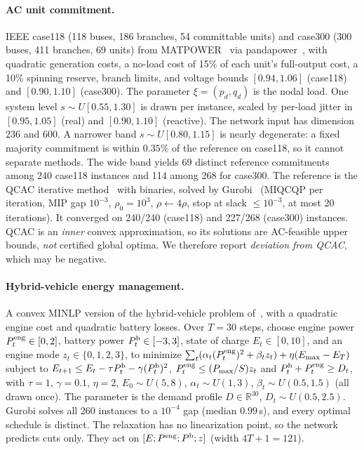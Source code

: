 \documentclass[10pt]{article}
\newcommand{\R}{\mathbb{R}}
\begin{document}
\paragraph{AC unit commitment.} IEEE case118 (118 buses, 186 branches, 54 committable units) and case300 (300 buses, 411 branches, 69 units) from MATPOWER~\citep{zimmerman2011matpower} via pandapower~\citep{thurner2018pandapower}, with quadratic generation costs, a no-load cost of 15\% of each unit's full-output cost, a 10\% spinning reserve, branch limits, and voltage bounds $[0.94,1.06]$ (case118) and $[0.90,1.10]$ (case300). The parameter $\xi=(p_d,q_d)$ is the nodal load. One system level $s\sim U[0.55,1.30]$ is drawn per instance, scaled by per-load jitter in $[0.95,1.05]$ (real) and $[0.90,1.10]$ (reactive). The network input has dimension $236$ and $600$. A narrower band $s\sim U[0.80,1.15]$ is nearly degenerate: a fixed majority commitment is within $0.35\%$ of the reference on case118, so it cannot separate methods. The wide band yields 69 distinct reference commitments among 240 case118 instances and 114 among 268 for case300. The reference is the QCAC iterative method~\citep{constante2025qcac} with binaries, solved by Gurobi~\citep{gurobi} (MIQCQP per iteration, MIP gap $10^{-3}$, $\rho_0=10^3$, $\rho\leftarrow4\rho$, stop at slack $\le10^{-3}$, at most 20 iterations). It converged on 240/240 (case118) and 227/268 (case300) instances. QCAC is an \emph{inner} convex approximation, so its solutions are AC-feasible upper bounds, \emph{not} certified global optima. We therefore report \emph{deviation from QCAC}, which may be negative.

\paragraph{Hybrid-vehicle energy management.} A convex MINLP version of the hybrid-vehicle problem of~\citep{dixit2025dfsm}, with a quadratic engine cost and quadratic battery losses. Over $T=30$ steps, choose engine power $P^{\rm eng}_t\in[0,2]$, battery power $P^{\rm b}_t\in[-3,3]$, state of charge $E_t\in[0,10]$, and an engine mode $z_t\in\{0,1,2,3\}$, to minimize $\sum_t(\alpha_t(P^{\rm eng}_t)^2+\beta_tz_t)+\eta(E_{\max}-E_T)$ subject to $E_{t+1}\le E_t-\tau P^{\rm b}_t-\gamma(P^{\rm b}_t)^2$, $P^{\rm eng}_t\le(P_{\max}/S)z_t$ and $P^{\rm b}_t+P^{\rm eng}_t\ge D_t$, with $\tau=1$, $\gamma=0.1$, $\eta=2$, $E_0\sim U(5,8)$, $\alpha_t\sim U(1,3)$, $\beta_t\sim U(0.5,1.5)$ (all drawn once). The parameter is the demand profile $D\in\R^{30}$, $D_t\sim U(0.5,2.5)$. Gurobi solves all 260 instances to a $10^{-4}$ gap (median $0.99$\,s), and every optimal schedule is distinct. The relaxation has no linearization point, so the network predicts cuts only. They act on $[E;P^{\rm eng};P^{\rm b};z]$ (width $4T+1=121$).
\end{document}
